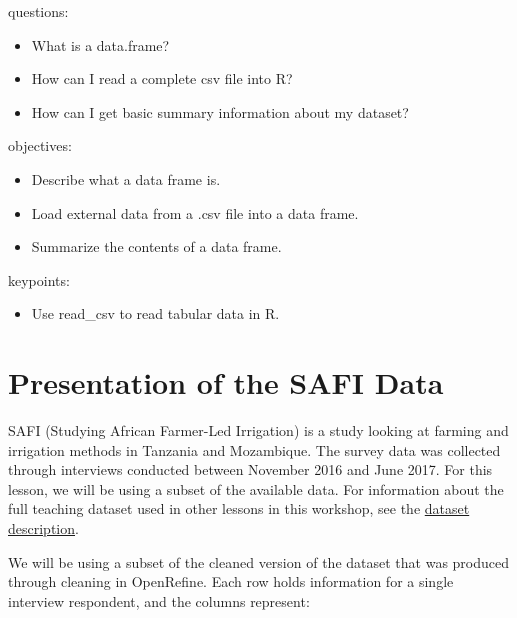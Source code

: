 \documentclass[]{book}
\providecommand{\tightlist}{%
  \setlength{\itemsep}{0pt}\setlength{\parskip}{0pt}}
\begin{document}
questions:

\begin{itemize}
\tightlist
\item
  What is a data.frame?\\
\item
  How can I read a complete csv file into R?\\
\item
  How can I get basic summary information about my dataset?
\end{itemize}

objectives:

\begin{itemize}
\tightlist
\item
  Describe what a data frame is.\\
\item
  Load external data from a .csv file into a data frame.\\
\item
  Summarize the contents of a data frame.
\end{itemize}

keypoints:

\begin{itemize}
\tightlist
\item
  Use read\_csv to read tabular data in R.
\end{itemize}

\section{Presentation of the SAFI
Data}\label{presentation-of-the-safi-data}

SAFI (Studying African Farmer-Led Irrigation) is a study looking at
farming and irrigation methods in Tanzania and Mozambique. The survey
data was collected through interviews conducted between November 2016
and June 2017. For this lesson, we will be using a subset of the
available data. For information about the full teaching dataset used in
other lessons in this workshop, see the
\href{http://www.datacarpentry.org/socialsci-workshop/data/}{dataset
description}.

We will be using a subset of the cleaned version of the dataset that was
produced through cleaning in OpenRefine. Each row holds information for
a single interview respondent, and the columns represent:
\end{document}
